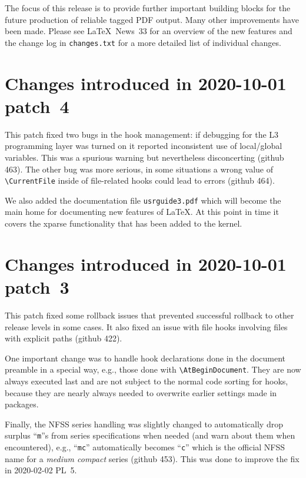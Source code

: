 \documentclass{ltxguide}
\newcommand\Lpack[1]{\mbox{\textsf{#1}}}
\newcommand\ghissue[1]{github #1}
\newcommand\ltnewsissue[1]{\LaTeX\ News~#1}
\newcommand\ghissue[1]{%
    \href{https://github.com/latex3/latex2e/issues/#1}{github #1}}
\newcommand\ltnewsissue[1]{%
    \href{https://www.latex-project.org/news/latex2e-news/ltnews#1.pdf}{\LaTeX\ News~#1}}
\begin{document}
The focus of this release is to provide further important building
blocks for the future production of reliable tagged PDF output.  Many
other improvements have been made. Please see \ltnewsissue{33} for an
overview of the new features and the change log in
\texttt{changes.txt} for a more detailed list of individual changes.

\section{Changes introduced in 2020-10-01 patch~4}

This patch fixed two bugs in the hook management: if debugging for the
L3 programming layer was turned on it reported inconsistent use of
local/global variables. This was a spurious warning but nevertheless
disconcerting (\ghissue{463}). The other bug was more serious, in some
situations a wrong value of \verb=\CurrentFile= inside of file-related hooks
could lead to errors (\ghissue{464}).

We also added the documentation file \texttt{usrguide3.pdf} which
will become the main home for documenting new features of \LaTeX. At
this point in time it covers the \Lpack{xparse} functionality that has
been added to the kernel.

\section{Changes introduced in 2020-10-01 patch~3}

This patch fixed some rollback issues that prevented successful
rollback to other release levels in some cases.  It also fixed an issue
with file hooks involving files with explicit paths  (\ghissue{422}).

One important change was to handle hook declarations done in the
document preamble in a special way, e.g., those done with
\verb=\AtBeginDocument=. They are now always executed last and are not
subject to the normal code sorting for hooks, because they are nearly always
needed to overwrite earlier settings made in packages.

Finally, the NFSS series handling was slightly changed to
automatically drop surplus ``\texttt{m}''s from series specifications
when needed (and warn about them when encountered), e.g.,
``\texttt{mc}'' automatically becomes ``\texttt{c}'' which is the
official NFSS name for a \emph{medium compact} series (\ghissue{453}).
This was done to improve the fix in 2020-02-02 PL~5.
\end{document}

